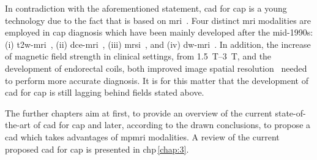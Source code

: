 In contradiction with the aforementioned statement, \ac{cad} for \ac{cap} is a young technology due to the fact that is based on \ac{mri}~\cite{Hegde2013}.
Four distinct \ac{mri} modalities are employed in \ac{cap} diagnosis which have been mainly developed after the mid-1990s: (i) \ac{t2w}-\ac{mri}~\cite{Hricak1983}, (ii) \ac{dce}-\ac{mri}~\cite{HuchBoni1995}, (iii) \ac{mrsi}~\cite{Kurhanewicz1996}, and (iv) \ac{dw}-\ac{mri}~\cite{Scheidler1999}.
In addition, the increase of magnetic field strength in clinical settings, from \SIrange{1.5}{3}{\tesla}, and the development of endorectal coils, both improved image spatial resolution~\cite{Swanson2001} needed to perform more accurate diagnosis.
It is for this matter that the development of \ac{cad} for \ac{cap} is still lagging behind fields stated above.

The further chapters aim at first, to provide an overview of the current state-of-the-art of \ac{cad} for \ac{cap} and later, according to the drawn conclusions, to propose a \ac{cad} which takes advantages of \ac{mpmri} modalities. 
A review of the current proposed \ac{cad} for \ac{cap} is presented in \acs{chp}\,\ref{chap:3}.

 



